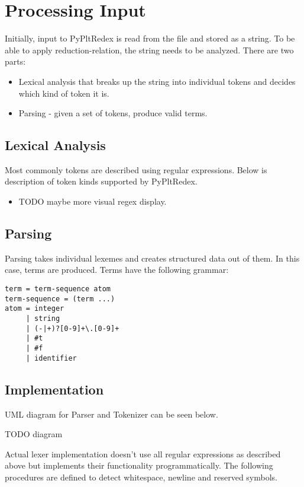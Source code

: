 \section{Processing Input}

Initially, input to PyPltRedex is read from the file and stored as a string. To be able to apply reduction-relation, the string needs to be analyzed. There are two parts:

\begin{itemize}
\item
Lexical analysis that breaks up the string into individual tokens and decides which kind of token it is.
\item
Parsing - given a set of tokens, produce valid terms.
\end{itemize}


\subsection{Lexical Analysis}

Most commonly tokens are described using regular expressions. Below is description of token kinds supported by PyPltRedex.
\begin{itemize}
\item
	TODO maybe more visual regex display.
\end{itemize}

\subsection{Parsing}

Parsing takes individual lexemes and creates structured data out of them. In this case, terms are produced. Terms have the following grammar:

\begin{lstlisting}
term = term-sequence atom
term-sequence = (term ...) 
atom = integer 
	 | string
	 | (-|+)?[0-9]+\.[0-9]+
	 | #t
	 | #f
	 | identifier
\end{lstlisting}


\subsection{Implementation}

UML diagram for Parser and Tokenizer can be seen below.

TODO diagram


Actual lexer implementation doesn't use all regular expressions as described above but implements their functionality programmatically. The following procedures are defined to detect whitespace, newline and reserved symbols.

